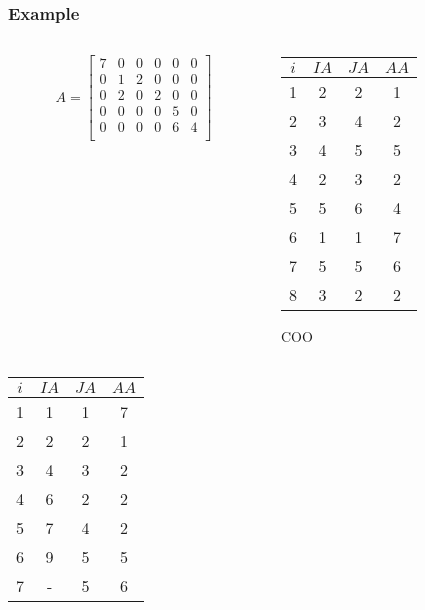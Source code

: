 \documentclass[10pt]{beamer}
\begin{document}
\begin{frame}[shrink]
\frametitle{Example}
\vspace{-0.5cm}

\begin{columns}
  \begin{column}{0.48\textwidth}
    \begin{equation*}
  A = \begin{bmatrix}
  7 & 0 &0 &0 &0 &0\\
  0&1&2 &0&0&0\\
  0&2&0&2&0&0\\
  0&0&0&0&5&0\\
  0&0&0&0&6&4\\
  \end{bmatrix}
\end{equation*}
  \end{column}
  \begin{column}{0.48\textwidth}
    \begin{center}
    \begin{tabular}{c | c c c}
    $i$ & $IA$ & $JA$ & $AA$\\\hline
    1 & 2 & 2 & 1\\
    2 & 3 & 4 & 2\\
    3 & 4 & 5 & 5\\
    4 & 2 & 3 & 2\\
    5 & 5 & 6 & 4\\
    6 & 1 & 1 & 7\\
    7 & 5 & 5 & 6\\
    8 & 3 & 2 & 2\\
    \end{tabular}
    COO
    \end{center}
  \end{column}
\end{columns}
\begin{columns}
  \begin{column}{0.48\textwidth}
    \begin{center}
    \begin{tabular}{c | c c c}
    $i$ & $IA$ & $JA$ & $AA$\\\hline
    1 & 1 & 1 & 7\\
    2 & 2 & 2 & 1\\
    3 & 4 & 3 & 2\\
    4 & 6 & 2 & 2\\
    5 & 7 & 4 & 2\\
    6 & 9 & 5 & 5\\
    7 & - & 5 & 6\\

\end{tabular}
\end{center}
\end{column}
\end{columns}
\end{frame}
\end{document}
